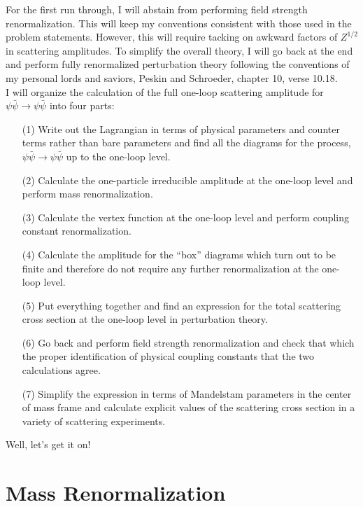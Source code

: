 \documentclass{article}
\begin{document}
For the first run through, I will abstain from performing field strength renormalization. This will keep my conventions consistent with those used in the problem statements. However, this will require tacking on awkward factors of $Z^{1/2}$ in scattering amplitudes. To simplify the overall theory, I will go back at the end and perform fully renormalized perturbation theory following the conventions of my personal lords and saviors, Peskin and Schroeder, chapter 10, verse 10.18. \bigskip \\
I will organize the calculation of the full one-loop scattering amplitude for $\psi \bar{\psi} \to \psi \bar{\psi}$ into four parts:
\begin{enumerate}
\item[(1)] Write out the Lagrangian in terms of physical parameters and counter terms rather than bare parameters and find all the diagrams for the process, $\psi \bar{\psi} \to \psi \bar{\psi}$ up to the one-loop level. 

\item[(2)] Calculate the one-particle irreducible amplitude at the one-loop level and perform mass renormalization.

\item[(3)] Calculate the vertex function at the one-loop level and perform coupling constant renormalization.

\item[(4)] Calculate the amplitude for the ``box'' diagrams which turn out to be finite and therefore do not require any further renormalization at the one-loop level. 

\item[(5)] Put everything together and find an expression for the total scattering cross section at the one-loop level in perturbation theory.

\item[(6)] Go back and perform field strength renormalization and check that which the proper identification of physical coupling constants that the two calculations agree.

\item[(7)] Simplify the expression in terms of Mandelstam parameters in the center of mass frame and calculate explicit values of the scattering cross section in a variety of scattering experiments. 
\end{enumerate} 
Well, let's get it on!

\section{Mass Renormalization}
\end{document}
